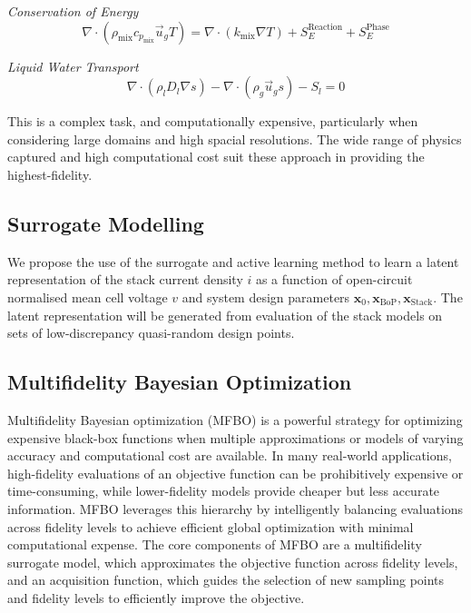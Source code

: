 \textit{Conservation of Energy}
\begin{equation}
	\nabla \cdot (\rho_\text{mix} c_p_\text{mix} \vec{u}_g T) = \nabla \cdot (k_\text{mix} \nabla T) + S_E^{\text{Reaction}} + S_E^{\text{Phase}}
\end{equation}

\textit{Liquid Water Transport}
\begin{equation}
	\nabla \cdot (\rho_l D_l \nabla s) - \nabla \cdot (\rho_g \vec{u}_g s) - S_l = 0 \label{eq:kone_water}
\end{equation}

This is a complex task, and computationally expensive, particularly when considering large domains and high spacial resolutions. The wide range of physics captured and high computational cost suit these approach in providing the highest-fidelity.

\subsection{Surrogate Modelling}
We propose the use of the surrogate and active learning method to learn a latent representation of the stack current density $i$ as a function of open-circuit normalised mean cell voltage $v$ and system design parameters $\bm{x}_0, \bm{x}_{\text{BoP}}, \bm{x}_{\text{Stack}}$.
The latent representation will be generated from evaluation of the stack models on sets of low-discrepancy quasi-random design points.

\subsection{Multifidelity Bayesian Optimization}

Multifidelity Bayesian optimization (MFBO) is a powerful strategy for optimizing expensive black-box functions when multiple approximations or models of varying accuracy and computational cost are available. In many real-world applications, high-fidelity evaluations of an objective function can be prohibitively expensive or time-consuming, while lower-fidelity models provide cheaper but less accurate information. MFBO leverages this hierarchy by intelligently balancing evaluations across fidelity levels to achieve efficient global optimization with minimal computational expense. The core components of MFBO are a multifidelity surrogate model, which approximates the objective function across fidelity levels, and an acquisition function, which guides the selection of new sampling points and fidelity levels to efficiently improve the objective.

